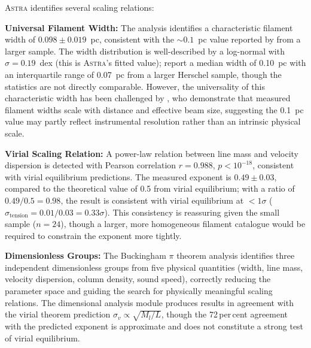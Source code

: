 \documentclass[usenatbib]{rasti}
\newcommand{\astra}{\textsc{Astra}\xspace}
\begin{document}
\astra identifies several scaling relations:

\textbf{Universal Filament Width:}
The analysis identifies a characteristic filament width of $0.098 \pm 0.019$~pc, consistent with the ${\sim}0.1$~pc value reported by \citet{Arzoumanian2011} from a larger sample.
The width distribution is well-described by a log-normal with $\sigma = 0.19$~dex (this is \astra's fitted value); \citet{Arzoumanian2019} report a median width of 0.10~pc with an interquartile range of 0.07~pc from a larger Herschel sample, though the statistics are not directly comparable.
However, the universality of this characteristic width has been challenged by \citet{Panopoulou2022}, who demonstrate that measured filament widths scale with distance and effective beam size, suggesting the 0.1~pc value may partly reflect instrumental resolution rather than an intrinsic physical scale.

\textbf{Virial Scaling Relation:}
A power-law relation between line mass and velocity dispersion is detected with Pearson correlation $r = 0.988$, $p < 10^{-18}$, consistent with virial equilibrium predictions.
The measured exponent is $0.49 \pm 0.03$, compared to the theoretical value of 0.5 from virial equilibrium; with a ratio of $0.49/0.5 = 0.98$, the result is consistent with virial equilibrium at $<1\sigma$ ($\sigma_\mathrm{tension} = 0.01/0.03 = 0.33\sigma$). This consistency is reassuring given the small sample ($n = 24$), though a larger, more homogeneous filament catalogue would be required to constrain the exponent more tightly.

\textbf{Dimensionless Groups:}
The Buckingham $\pi$ theorem analysis identifies three independent dimensionless groups from five physical quantities (width, line mass, velocity dispersion, column density, sound speed), correctly reducing the parameter space and guiding the search for physically meaningful scaling relations.
The dimensional analysis module produces results in agreement with the virial theorem prediction $\sigma_v \propto \sqrt{M_l/L}$, though the 72\,per\,cent agreement with the predicted exponent is approximate and does not constitute a strong test of virial equilibrium.
\end{document}
